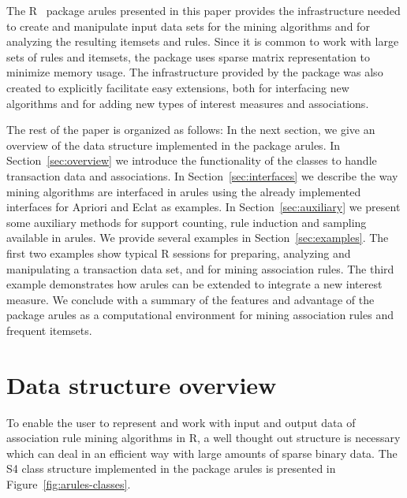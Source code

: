 \documentclass[10pt,a4paper]{article}
\newcommand{\strong}[1]{{\normalfont\fontseries{b}\selectfont #1}}
\newcommand{\pkg}[1]{\strong{#1}}
\newcommand{\proglang}[1]{\textsf{#1}}
\begin{document}
The \proglang{R}~\citep{arules:R:2005} 
package \pkg{arules} presented in this paper provides
the infrastructure needed to create and manipulate input data sets for
the mining algorithms and for analyzing the resulting itemsets and
rules.  Since it is common to work with large sets of rules and
itemsets, the package uses sparse matrix representation to minimize
memory usage.  The infrastructure provided by the package was also
created to explicitly facilitate easy extensions, both for interfacing
new algorithms and for adding new types of interest measures and
associations.

The rest of the paper is organized as follows: In the next section, we
give an overview of the data structure implemented in the package
\pkg{arules}.  
In Section~\ref{sec:overview}
we introduce the functionality of the classes to
handle transaction data and associations.  In
Section~\ref{sec:interfaces} we describe the way mining algorithms are
interfaced in \pkg{arules} using the already implemented interfaces for
Apriori and Eclat as examples.  
In Section~\ref{sec:auxiliary} we present some auxiliary methods 
for support counting, rule induction and sampling
available in \pkg{arules}.
We provide several examples in
Section~\ref{sec:examples}.
The
first two examples show typical \proglang{R} sessions for preparing, 
analyzing and
manipulating a transaction data set, and for mining association rules.
The third example demonstrates how \pkg{arules} can be extended to
integrate a new interest measure.  We conclude with a summary of the
features and advantage of the package \pkg{arules} as a computational
environment for mining association rules and frequent itemsets.

\section{Data structure overview\label{sec:overview}}

To enable the user to represent and work with input and output data of
association rule mining algorithms in \proglang{R}, a well thought out
structure is necessary which can deal in an efficient way with large
amounts of sparse binary data.  The \proglang{S4} class structure 
implemented in
the package \pkg{arules} is presented in
Figure~\ref{fig:arules-classes}.
\end{document}
